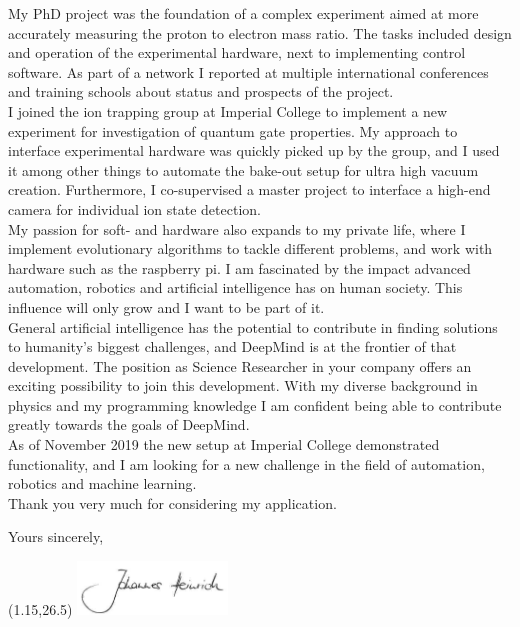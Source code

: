 \documentclass[10pt, a4paper]{class_cover_letter}
\begin{document}
My PhD project was the foundation of a complex experiment aimed at more accurately measuring the proton to electron mass ratio. The tasks included design and operation of the experimental hardware, next to implementing control software. As part of a network I reported at multiple international conferences and training schools about status and prospects of the project.\\

I joined the ion trapping group at Imperial College to implement a new experiment for investigation of quantum gate properties. My approach to interface experimental hardware was quickly picked up by the group, and I used it among other things to automate the bake-out setup for ultra high vacuum creation. Furthermore, I co-supervised a master project to interface a high-end camera for individual ion state detection.\\

My passion for soft- and hardware also expands to my private life, where I implement evolutionary algorithms to tackle different problems, and work with hardware such as the raspberry pi. I am fascinated by the impact advanced automation, robotics and artificial intelligence has on human society. This influence will only grow and I want to be part of it.\\

General artificial intelligence has the potential to contribute in finding solutions to humanity's biggest challenges, and DeepMind is at the frontier of that development. The position as Science Researcher in your company offers an exciting possibility to join this development. With my diverse background in physics and my programming knowledge I am confident being able to contribute greatly towards the goals of DeepMind.\\

As of November 2019 the new setup at Imperial College demonstrated functionality, and I am looking for a new challenge in the field of automation, robotics and machine learning. \\

Thank you very much for considering my application.

\vspace{0.7cm}
Yours sincerely,

\begin{textblock}{10}(1.15,26.5)
\includegraphics[width=4cm]{unterschrift.png}
\end{textblock}
\end{document}
